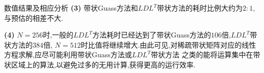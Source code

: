 \documentclass{article}
\begin{document}
\begin{section}{数值结果及相应分析}
    \textbf{(3) }带状Guass方法和$LDL^T$带状方法的耗时比例大约为$2:1$,与预估的相差不大.

    \textbf{(4) }$N=256$时,一般的$LDL^T$方法耗时已经达到了带状Guass方法的$106$倍,$LDL^T$带状方法的$384$倍,
    $N=512$时比值将继续增大.由此可见,对稀疏带状矩阵对应的线性方程求解,应尽可能利用带状Guass方法或$LDL^T$带状方法
    之类的能将运算集中在带状区域上的算法,以避免过多的无用计算,获得更高的运行效率.
\end{section}
\end{document}

